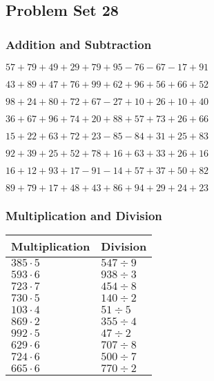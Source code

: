 \hypertarget{problem-set-28}{%
\subsection{Problem Set 28}\label{problem-set-28}}

\hypertarget{addition-and-subtraction}{%
\subsubsection{Addition and
Subtraction}\label{addition-and-subtraction}}

\(57+79+49+29+79+95-76-67-17+91\)

\(43+89+47+76+99+62+96+56+66+52\)

\(98+24+80+72+67-27+10+26+10+40\)

\(36+67+96+74+20+88+57+73+26+66\)

\(15+22+63+72+23-85-84+31+25+83\)

\(92+39+25+52+78+16+63+33+26+16\)

\(16+12+93+17-91-14+57+37+50+82\)

\(89+79+17+48+43+86+94+29+24+23\)

\hypertarget{multiplication-and-division}{%
\subsubsection{Multiplication and
Division}\label{multiplication-and-division}}

\begin{longtable}[]{@{}ll@{}}
\toprule
Multiplication & Division\tabularnewline
\midrule
\endhead
\(385\cdot5\) & \(547÷9\)\tabularnewline
\(593\cdot6\) & \(938÷3\)\tabularnewline
\(723\cdot7\) & \(454÷8\)\tabularnewline
\(730\cdot5\) & \(140÷2\)\tabularnewline
\(103\cdot4\) & \(51÷5\)\tabularnewline
\(869\cdot2\) & \(355÷4\)\tabularnewline
\(992\cdot5\) & \(47÷2\)\tabularnewline
\(629\cdot6\) & \(707÷8\)\tabularnewline
\(724\cdot6\) & \(500÷7\)\tabularnewline
\(665\cdot6\) & \(770÷2\)\tabularnewline
\bottomrule
\end{longtable}

